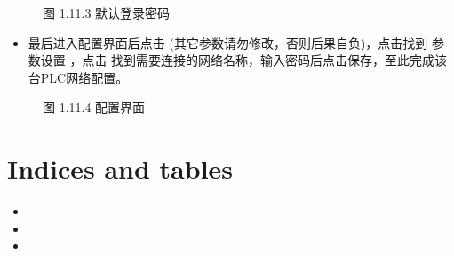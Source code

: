 \documentclass[a4paper,10pt,english]{sphinxmanual}
\begin{document}
\begin{figure}[htbp]
\centering
\capstart

\noindent{}
\caption{图 1.11.3 默认登录密码}\label{\detokenize{operation_guide:id27}}\end{figure}
\begin{itemize}
\item {} 
\sphinxAtStartPar
最后进入配置界面后点击  (其它参数请勿修改，否则后果自负)，点击找到  参数设置 ，点击  找到需要连接的网络名称，输入密码后点击保存，至此完成该台PLC网络配置。

\end{itemize}

\begin{figure}[htbp]
\centering
\capstart

\noindent{}
\caption{图 1.11.4 配置界面}\label{\detokenize{operation_guide:id28}}\end{figure}


\chapter{Indices and tables}
\label{\detokenize{index:indices-and-tables}}\begin{itemize}
\item {} 
\sphinxAtStartPar
{}

\item {} 
\sphinxAtStartPar
{}

\item {} 
\sphinxAtStartPar
{}

\end{itemize}



\renewcommand{\indexname}{索引}
\printindex
\end{document}
